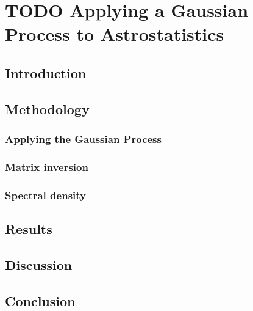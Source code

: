 \section{TODO Applying a Gaussian Process to Astrostatistics}
% 
% 
% 
% 
% 
% 
% 
% 


\subsection{Introduction}



\subsection{Methodology}


\subsubsection{Applying the Gaussian Process}


\subsubsection{Matrix inversion}


\subsubsection{Spectral density}


\subsection{Results}


\subsection{Discussion}


\subsection{Conclusion}
